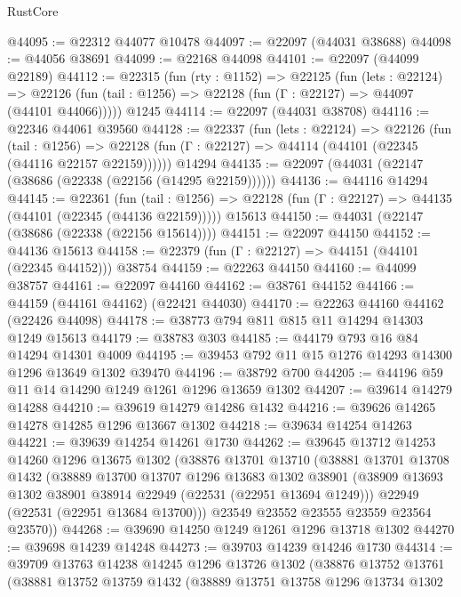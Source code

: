 \begin{lexlean}{RustCore}
\begin{coremodule}
@44095 := @22312 @44077 @10478
@44097 := @22097 (@44031 @38688)
@44098 := @44056 @38691
@44099 := @22168 @44098
@44101 := @22097 (@44099 @22189)
@44112 := @22315
    (fun (rty : @1152) =>
    @22125
      (fun (lets : @22124) =>
      @22126 (fun (tail : @1256) => @22128 (fun (Γ : @22127) => @44097 (@44101 @44066)))))
    @1245
@44114 := @22097 (@44031 @38708)
@44116 := @22346 @44061 @39560
@44128 := @22337
    (fun (lets : @22124) =>
    @22126
      (fun (tail : @1256) =>
      @22128 (fun (Γ : @22127) => @44114 (@44101 (@22345 (@44116 @22157 @22159))))))
    @14294
@44135 := @22097 (@44031 (@22147 (@38686 (@22338 (@22156 (@14295 @22159))))))
@44136 := @44116 @14294
@44145 := @22361
    (fun (tail : @1256) => @22128 (fun (Γ : @22127) => @44135 (@44101 (@22345 (@44136 @22159)))))
    @15613
@44150 := @44031 (@22147 (@38686 (@22338 (@22156 @15614))))
@44151 := @22097 @44150
@44152 := @44136 @15613
@44158 := @22379 (fun (Γ : @22127) => @44151 (@44101 (@22345 @44152))) @38754
@44159 := @22263 @44150
@44160 := @44099 @38757
@44161 := @22097 @44160
@44162 := @38761 @44152
@44166 := @44159 (@44161 @44162) (@22421 @44030)
@44170 := @22263 @44160 @44162 (@22426 @44098)
@44178 := @38773 @794 @811 @815 @11 @14294 @14303 @1249 @15613
@44179 := @38783 @303
@44185 := @44179 @793 @16 @84 @14294 @14301 @4009
@44195 := @39453 @792 @11 @15 @1276 @14293 @14300 @1296 @13649 @1302 @39470
@44196 := @38792 @700
@44205 := @44196 @59 @11 @14 @14290 @1249 @1261 @1296 @13659 @1302
@44207 := @39614 @14279 @14288
@44210 := @39619 @14279 @14286 @1432
@44216 := @39626 @14265 @14278 @14285 @1296 @13667 @1302
@44218 := @39634 @14254 @14263
@44221 := @39639 @14254 @14261 @1730
@44262 := @39645
    @13712
    @14253
    @14260
    @1296
    @13675
    @1302
    (@38876
      @13701
      @13710
      (@38881
        @13701
        @13708
        @1432
        (@38889
          @13700
          @13707
          @1296
          @13683
          @1302
          @38901
          (@38909 @13693 @1302 @38901 @38914 @22949 (@22531 (@22951 @13694 @1249)))
          @22949
          (@22531 (@22951 @13684 @13700)))
        @23549
        @23552
        @23555
        @23559
        @23564
        @23570))
@44268 := @39690 @14250 @1249 @1261 @1296 @13718 @1302
@44270 := @39698 @14239 @14248
@44273 := @39703 @14239 @14246 @1730
@44314 := @39709
    @13763
    @14238
    @14245
    @1296
    @13726
    @1302
    (@38876
      @13752
      @13761
      (@38881
        @13752
        @13759
        @1432
        (@38889
          @13751
          @13758
          @1296
          @13734
          @1302

\end{coremodule}
\end{lexlean}
